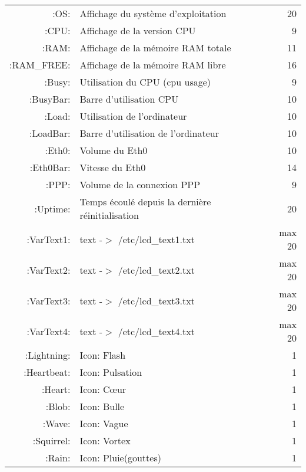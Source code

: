 \begin{description}
\begin{small}
\begin{center}
\begin{longtable}{rp{7cm}r}
                    :OS: &       Affichage du système d'exploitation &  20 \\
                   :CPU: &       Affichage de la version CPU         &   9 \\
                   :RAM: &       Affichage de la mémoire RAM totale  &  11 \\
             :RAM\_FREE: &       Affichage de la mémoire RAM libre   &  16 \\                   
                  :Busy: &       Utilisation du CPU (cpu usage)      &   9 \\
               :BusyBar: &       Barre d'utilisation CPU             &  10 \\
                  :Load: &       Utilisation de l'ordinateur         &  10 \\
               :LoadBar: &       Barre d'utilisation de l'ordinateur &  10 \\
                  :Eth0: &       Volume du Eth0                      &  10 \\
               :Eth0Bar: &       Vitesse du Eth0                     &  14 \\
                   :PPP: &       Volume de la connexion PPP          &   9 \\
                :Uptime: &       Temps écoulé depuis la dernière réinitialisation &  20 \\

              :VarText1: &       text -$>$ /etc/lcd\_text1.txt & max 20 \\
              :VarText2: &       text -$>$ /etc/lcd\_text2.txt & max 20 \\
              :VarText3: &       text -$>$ /etc/lcd\_text3.txt & max 20 \\
              :VarText4: &       text -$>$ /etc/lcd\_text4.txt & max 20 \\

             :Lightning: &       Icon: Flash          &  1 \\
             :Heartbeat: &       Icon: Pulsation      &  1 \\
                 :Heart: &       Icon: C\oe{}ur       &  1 \\
                  :Blob: &       Icon: Bulle          &  1 \\
                  :Wave: &       Icon: Vague          &  1 \\
              :Squirrel: &       Icon: Vortex         &  1 \\
                  :Rain: &       Icon: Pluie(gouttes) &  1 \\


\end{longtable}
\end{center}
\end{small}
\end{description}
